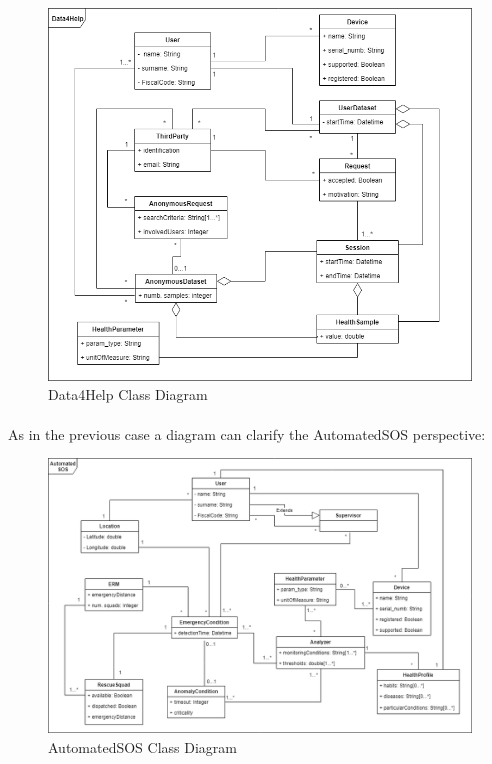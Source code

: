 \begin{figure}[H]
	\centering\setlength{\captionmargin}{0pt}%
	\includegraphics[scale=0.5]{Images/UML/D4H_class.png}
	\caption{Data4Help Class Diagram}
	\label{figure11}
\end{figure} 
\paragraph{}
As in the previous case a diagram can clarify the AutomatedSOS perspective:

\begin{figure}[H]
	\centering\setlength{\captionmargin}{0pt}%
	\includegraphics[scale=0.5]{Images/UML/ASOS_class.png}
	\caption{AutomatedSOS Class Diagram}
	\label{figure11}
\end{figure}



